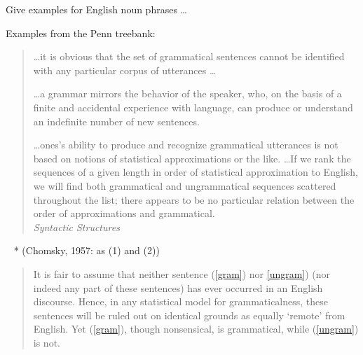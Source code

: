 \documentclass[a4paper,landscape,headrule,footrule]{foils}
\begin{document}
Give examples for English noun phrases \ldots

Examples from the Penn treebank:
\begin{exe}
  \ex {}
  \ex {}
  \ex {}
  \ex {}
  \ex {}
\ex {}
\ex {}
\end{exe}




\begin{quotation}
\ldots it is obvious that the set of grammatical
sentences cannot be identified with any particular corpus
of utterances \ldots  

\bigskip
\ldots a grammar mirrors the behavior of the speaker, who,
on the basis of a finite and accidental experience with
language, can produce or understand an indefinite
number of new sentences.   

\bigskip
\ldots  ones's ability to produce and recognize
grammatical utterances is not based on notions of
statistical approximations or the like.
\ldots  If we rank the sequences of a given length in order of
statistical approximation to English, we will find both
grammatical and ungrammatical sequences scattered
throughout the list; there appears to be no particular
relation between the order of approximations and
grammatical.  
\\ \mbox{} \hfill \citet[pp15--17]{Chomsky:1957} \textit{Syntactic Structures}  
\end{quotation}


 \begin{exe}
 \ex\label{gram} {~}
 \ex\label{ungram} *
 \hfill (Chomsky, 1957: as (1) and (2))
 \end{exe}
 \begin{quote}
   It is fair to assume that neither sentence (\ref{gram}) nor
   \ref{ungram}) (nor indeed any part of these sentences) has ever
   occurred in an English discourse. Hence, in any statistical model
   for grammaticalness, these sentences will be ruled out on identical
   grounds as equally `remote' from English. Yet (\ref{gram}), though
   nonsensical, is grammatical, while (\ref{ungram}) is not.
 \end{quote}
\end{document}
